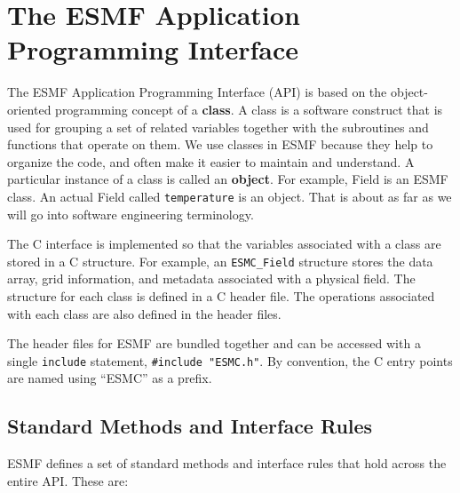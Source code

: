 %

\section{The ESMF Application Programming Interface}

The ESMF Application Programming Interface (API) is based on the
object-oriented programming concept of a {\bf class}.  A class is a 
software construct that is used for grouping a set of related variables 
together with the subroutines and functions that operate on them.  We 
use classes in ESMF because they help to organize the code, and often 
make it easier to maintain and understand.  A particular instance
of a class is called an {\bf object}.  For example, Field is an 
ESMF class.  An actual Field called {\tt temperature} is an object. 
That is about as far as we will go into software engineering
terminology.  

The C interface is implemented so that the variables associated
with a class are stored in a C structure.  For example, an 
{\tt ESMC\_Field} structure stores the data array, grid 
information, and metadata associated with a physical field.
The structure for each class is defined in a C header file. 
The operations associated with each class are also
defined in the header files.

The header files for ESMF are bundled together and can be accessed with a 
single {\tt include} statement, {\tt \#include "ESMC.h"}.  By convention,
the C entry points are named using ``ESMC'' as a prefix.

\subsection{Standard Methods and Interface Rules}

ESMF defines a set of standard methods and interface rules that
hold across the entire API.  These are: 

